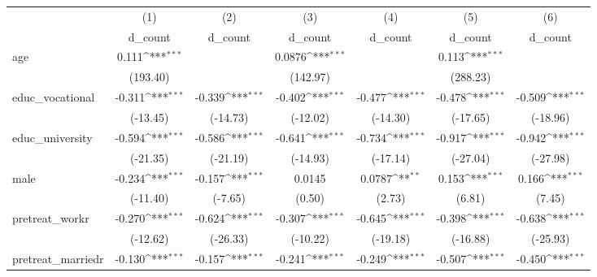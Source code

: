 {
\def\sym#1{\ifmmode^{#1}\else\(^{#1}\)\fi}
\begin{tabular}{l*{6}{c}}
\hline\hline
            &\multicolumn{1}{c}{(1)}&\multicolumn{1}{c}{(2)}&\multicolumn{1}{c}{(3)}&\multicolumn{1}{c}{(4)}&\multicolumn{1}{c}{(5)}&\multicolumn{1}{c}{(6)}\\
            &\multicolumn{1}{c}{d\_count}&\multicolumn{1}{c}{d\_count}&\multicolumn{1}{c}{d\_count}&\multicolumn{1}{c}{d\_count}&\multicolumn{1}{c}{d\_count}&\multicolumn{1}{c}{d\_count}\\
\hline
age         &       0.111\sym{***}&                     &      0.0876\sym{***}&                     &       0.113\sym{***}&                     \\
            &    (193.40)         &                     &    (142.97)         &                     &    (288.23)         &                     \\
[1em]
educ\_vocational&      -0.311\sym{***}&      -0.339\sym{***}&      -0.402\sym{***}&      -0.477\sym{***}&      -0.478\sym{***}&      -0.509\sym{***}\\
            &    (-13.45)         &    (-14.73)         &    (-12.02)         &    (-14.30)         &    (-17.65)         &    (-18.96)         \\
[1em]
educ\_university&      -0.594\sym{***}&      -0.586\sym{***}&      -0.641\sym{***}&      -0.734\sym{***}&      -0.917\sym{***}&      -0.942\sym{***}\\
            &    (-21.35)         &    (-21.19)         &    (-14.93)         &    (-17.14)         &    (-27.04)         &    (-27.98)         \\
[1em]
male        &      -0.234\sym{***}&      -0.157\sym{***}&      0.0145         &      0.0787\sym{**} &       0.153\sym{***}&       0.166\sym{***}\\
            &    (-11.40)         &     (-7.65)         &      (0.50)         &      (2.73)         &      (6.81)         &      (7.45)         \\
[1em]
pretreat\_workr&      -0.270\sym{***}&      -0.624\sym{***}&      -0.307\sym{***}&      -0.645\sym{***}&      -0.398\sym{***}&      -0.638\sym{***}\\
            &    (-12.62)         &    (-26.33)         &    (-10.22)         &    (-19.18)         &    (-16.88)         &    (-25.93)         \\
[1em]
pretreat\_marriedr&      -0.130\sym{***}&      -0.157\sym{***}&      -0.241\sym{***}&      -0.249\sym{***}&      -0.507\sym{***}&      -0.450\sym{***}\\

\end{tabular}}
